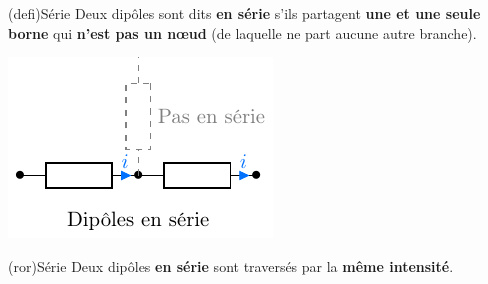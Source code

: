 \documentclass[../../main/main.tex]{subfiles}
\begin{document}
\begin{tcb}[sidebyside, righthand ratio=.4](defi){Série}
	Deux dipôles sont dits \textbf{en série} s'ils partagent \textbf{une et une
		seule borne} qui \textbf{n'est pas un nœud} (de laquelle ne part aucune
	autre branche).
	\tcblower
	\begin{center}
		\includegraphics[width=\linewidth]{serie}
	\end{center}
\end{tcb}
\begin{tcb}[label=ror:serdiv, fontupper=\Large](ror){Série}
	Deux dipôles \textbf{en série} sont traversés par la \textbf{même
		intensité}.
\end{tcb}
\end{document}
